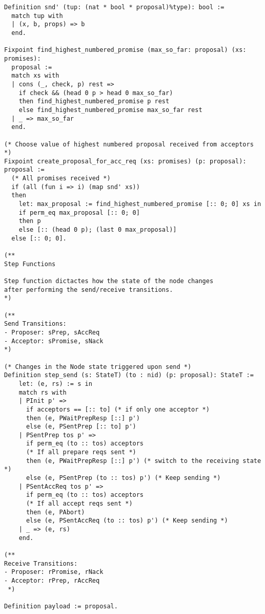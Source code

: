 \begin{landscape}
\begin{multicols*}{2}
\begin{lstlisting}[style=SourceCodeListing]
Definition snd' (tup: (nat * bool * proposal)%type): bool :=
  match tup with
  | (x, b, props) => b
  end.

Fixpoint find_highest_numbered_promise (max_so_far: proposal) (xs: promises):
  proposal :=
  match xs with
  | cons (_, check, p) rest =>
    if check && (head 0 p > head 0 max_so_far)
    then find_highest_numbered_promise p rest
    else find_highest_numbered_promise max_so_far rest
  | _ => max_so_far
  end.

(* Choose value of highest numbered proposal received from acceptors *)
Fixpoint create_proposal_for_acc_req (xs: promises) (p: proposal): proposal :=
  (* All promises received *)
  if (all (fun i => i) (map snd' xs))
  then
    let: max_proposal := find_highest_numbered_promise [:: 0; 0] xs in
    if perm_eq max_proposal [:: 0; 0]
    then p
    else [:: (head 0 p); (last 0 max_proposal)]
  else [:: 0; 0].

(**
Step Functions

Step function dictactes how the state of the node changes
after performing the send/receive transitions.
*)

(**
Send Transitions:
- Proposer: sPrep, sAccReq
- Acceptor: sPromise, sNack
*)

(* Changes in the Node state triggered upon send *)
Definition step_send (s: StateT) (to : nid) (p: proposal): StateT :=
    let: (e, rs) := s in
    match rs with
    | PInit p' =>
      if acceptors == [:: to] (* if only one acceptor *)
      then (e, PWaitPrepResp [::] p')
      else (e, PSentPrep [:: to] p')
    | PSentPrep tos p' =>
      if perm_eq (to :: tos) acceptors
      (* If all prepare reqs sent *)
      then (e, PWaitPrepResp [::] p') (* switch to the receiving state *)
      else (e, PSentPrep (to :: tos) p') (* Keep sending *)
    | PSentAccReq tos p' =>
      if perm_eq (to :: tos) acceptors
      (* If all accept reqs sent *)
      then (e, PAbort)
      else (e, PSentAccReq (to :: tos) p') (* Keep sending *)
    | _ => (e, rs)
    end.

(**
Receive Transitions:
- Proposer: rPromise, rNack
- Acceptor: rPrep, rAccReq
 *)

Definition payload := proposal.


\end{lstlisting}
\end{multicols*}
\end{landscape}
